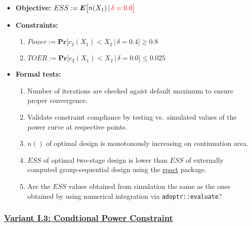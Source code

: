 \documentclass[]{book}
\providecommand{\tightlist}{%
  \setlength{\itemsep}{0pt}\setlength{\parskip}{0pt}}
\begin{document}
\begin{itemize}
\tightlist
\item
  \textbf{Objective:} \(ESS := \boldsymbol{E}\big[n(X_1)\,|\,\color{red}{\delta=0.0}\big]\)
\item
  \textbf{Constraints:}

  \begin{enumerate}
  \def\labelenumi{\arabic{enumi}.}
  \tightlist
  \item
    \(Power := \boldsymbol{Pr}\big[c_2(X_1) < X_2\,|\,\delta=0.4\big] \geq 0.8\)
  \item
    \(TOER := \boldsymbol{Pr}\big[c_2(X_1) < X_2\,|\,\delta=0.0\big] \leq 0.025\)
  \end{enumerate}
\item
  \textbf{Formal tests:}

  \begin{enumerate}
  \def\labelenumi{\arabic{enumi}.}
  \tightlist
  \item
    Number of iterations are checked agaist default maximum to ensure proper
    convergence.
  \item
    Validate constraint compliance by testing vs.~simulated
    values of the power curve at respective points.
  \item
    \(n()\) of optimal design is monotonously increasing on continuation area.
  \item
    \(ESS\) of optimal two-stage design is lower than \(ESS\) of externally
    computed group-sequential design using the \href{https://rpact.org/}{rpact} package.
  \item
    Are the \(ESS\) values obtained from simulation the same as the ones
    obtained by using numerical integration via \texttt{adoptr::evaluate}?
  \end{enumerate}
\end{itemize}

\hypertarget{variant-i.3-condtional-power-constraint}{%
\subsubsection{\texorpdfstring{\protect\hyperlink{variantI_3}{Variant I.3: Condtional Power Constraint}}{Variant I.3: Condtional Power Constraint}}\label{variant-i.3-condtional-power-constraint}}
\end{document}
